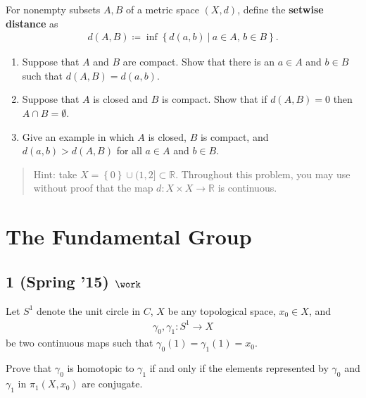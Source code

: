 \begin{problem}[Spring 2021, 3]

For nonempty subsets \(A, B\) of a metric space \((X, d)\), define the
\textbf{setwise distance} as
\begin{align*}
d(A, B) \coloneqq\inf \left\{{ d(a, b) {~\mathrel{\Big|}~}a\in A,\, b\in B }\right\} 
.\end{align*}

\begin{enumerate}
\def\labelenumi{\alph{enumi}.}
\item
  Suppose that \(A\) and \(B\) are compact. Show that there is an
  \(a\in A\) and \(b\in B\) such that \(d(A, B) = d(a, b)\).
\item
  Suppose that \(A\) is closed and \(B\) is compact. Show that if
  \(d(A, B) = 0\) then \(A \cap B = \emptyset\).
\item
  Give an example in which \(A\) is closed, \(B\) is compact, and
  \(d(a, b) > d(A, B)\) for all \(a\in A\) and \(b\in B\).
\end{enumerate}

\begin{quote}
Hint: take \(X = \left\{{ 0 }\right\} \cup(1, 2] \subset {\mathbb{R}}\).
Throughout this problem, you may use without proof that the map
\(d:X\times X\to {\mathbb{R}}\) is continuous.
\end{quote}

\end{problem}

\hypertarget{the-fundamental-group}{%
\section{The Fundamental Group}\label{the-fundamental-group}}

\hypertarget{spring-15-work}{%
\subsection{\texorpdfstring{1 (Spring '15)
\(\work\)}{1 (Spring '15) \textbackslash work}}\label{spring-15-work}}

Let \(S^1\) denote the unit circle in \(C\), \(X\) be any topological
space, \(x_0 \in X\), and
\begin{align*}\gamma_0, \gamma_1 : S^1 \to X\end{align*}
be two continuous maps such that \(\gamma_0 (1) = \gamma_1 (1) = x_0\).

Prove that \(\gamma_0\) is homotopic to \(\gamma_1\) if and only if the
elements represented by \(\gamma_0\) and \(\gamma_1\) in
\(\pi_1 (X, x_0 )\) are conjugate.

